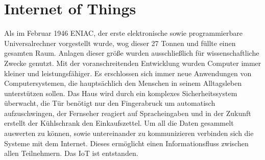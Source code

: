 \chapter{Internet of Things}\label{c:IoT}

Als im Februar 1946 ENIAC, der erste elektronische sowie programmierbare Universalrechner vorgestellt wurde, wog dieser 27 Tonnen und füllte einen gesamten Raum. Anlagen dieser größe wurden ausschließlich für wissenschaftliche Zwecke genutzt.
Mit der voranschreitenden Entwicklung wurden Computer immer kleiner und leistungsfähiger. Es erschlossen sich immer neue Anwendungen von Computersystemen, die hauptsächlich den Menschen in seinem Alltagsleben unterstützen sollen.
Das Haus wird durch ein komplexes Sicherheitssystem überwacht, die Tür benötigt nur den Fingerabruck um automatisch aufzuschwingen, der Fernseher reagiert auf Spracheingaben und in der Zukunft erstellt der Kühlschrank den Einkaufszettel.
Um all die Daten gesammelt auswerten zu können, sowie untereinander zu kommunizieren verbinden sich die Systeme mit dem Internet. Dieses ermöglicht einen Informationsfluss zwischen allen Teilnehmern. 
Das IoT ist entstanden.



